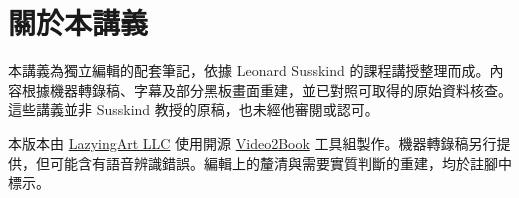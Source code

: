 \documentclass[11pt,oneside]{book}
\begin{document}
\frontmatter
\hypersetup{pageanchor=false}

\hypersetup{pageanchor=true}

\clearpage
\chapter*{關於本講義}
本講義為獨立編輯的配套筆記，依據 Leonard Susskind 的課程講授整理而成。內容根據機器轉錄稿、字幕及部分黑板畫面重建，並已對照可取得的原始資料核查。這些講義並非 Susskind 教授的原稿，也未經他審閱或認可。

本版本由 \href{https://lazying.art}{LazyingArt LLC} 使用開源 \href{https://github.com/lachlanchen/Video2Book}{Video2Book} 工具組製作。機器轉錄稿另行提供，但可能含有語音辨識錯誤。編輯上的釐清與需要實質判斷的重建，均於註腳中標示。
\clearpage
\tableofcontents
\mainmatter









\end{document}
